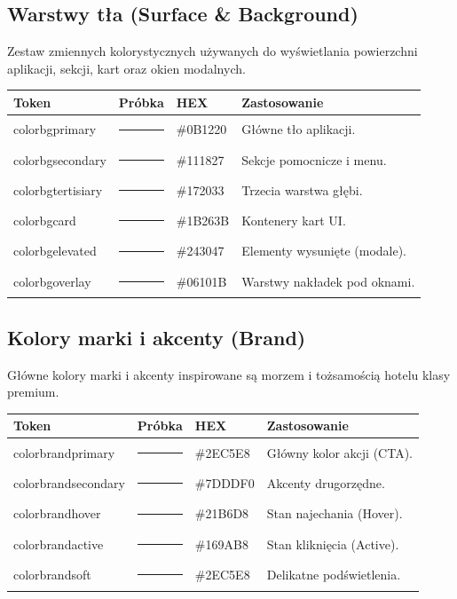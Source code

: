 \subsection{Warstwy tła (Surface \& Background)}
Zestaw zmiennych kolorystycznych używanych do wyświetlania powierzchni aplikacji, sekcji, kart oraz okien modalnych.

\begin{table}[H]
\centering
\small
\begin{tabular}{|l|c|l|p{6.5cm}|}
\hline
\textbf{Token} & \textbf{Próbka} & \textbf{HEX} & \textbf{Zastosowanie} \\ \hline
\/color\/bg\/primary & {\color{bgColorPrimary}\rule{0.8cm}{0.4cm}} & \#0B1220 & Główne tło aplikacji. \\ \hline
\/color\/bg\/secondary & {\color{bgColorSecondary}\rule{0.8cm}{0.4cm}} & \#111827 & Sekcje pomocnicze i menu. \\ \hline
\/color\/bg\/tertisiary & {\color{bgColorTertiary}\rule{0.8cm}{0.4cm}} & \#172033 & Trzecia warstwa głębi. \\ \hline
\/color\/bg\/card & {\color{bgColorCard}\rule{0.8cm}{0.4cm}} & \#1B263B & Kontenery kart UI. \\ \hline
\/color\/bg\/elevated & {\color{bgColorElevated}\rule{0.8cm}{0.4cm}} & \#243047 & Elementy wysunięte (modale). \\ \hline
\/color\/bg\/overlay & {\color{bgColorOverlay}\rule{0.8cm}{0.4cm}} & \#06101B & Warstwy nakładek pod oknami. \\ \hline
\end{tabular}
\end{table}

\subsection{Kolory marki i akcenty (Brand)}
Główne kolory marki i akcenty inspirowane są morzem i tożsamością hotelu klasy premium.

\begin{table}[H]
\centering
\small
\begin{tabular}{|l|c|l|l|}
\hline
\textbf{Token} & \textbf{Próbka} & \textbf{HEX} & \textbf{Zastosowanie} \\ \hline
\/color\/brand\/primary & {\color{brandColorPrimary}\rule{0.8cm}{0.4cm}} & \#2EC5E8 & Główny kolor akcji (CTA). \\ \hline
\/color\/brand\/secondary & {\color{brandColorSecondary}\rule{0.8cm}{0.4cm}} & \#7DDDF0 & Akcenty drugorzędne. \\ \hline
\/color\/brand\/hover & {\color{brandColorHover}\rule{0.8cm}{0.4cm}} & \#21B6D8 & Stan najechania (Hover). \\ \hline
\/color\/brand\/active & {\color{brandColorActive}\rule{0.8cm}{0.4cm}} & \#169AB8 & Stan kliknięcia (Active). \\ \hline
\/color\/brand\/soft & {\color{brandColorPrimary}\rule{0.8cm}{0.4cm}} & \#2EC5E8 & Delikatne podświetlenia. \\ \hline
\end{tabular}
\end{table}

